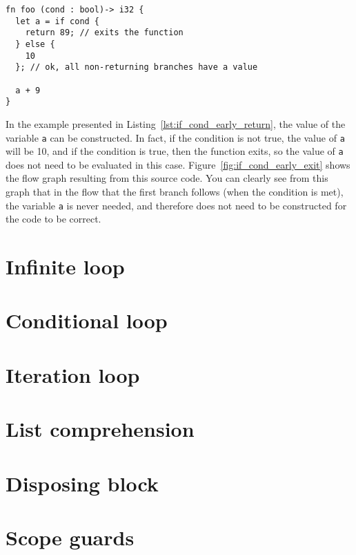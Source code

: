 \begin{lstlisting}[style=coloredverbatim, caption=Early return in \texttt{if} condition, label=lst:if_cond_early_return]
fn foo (cond : bool)-> i32 {
  let a = if cond {
    return 89; // exits the function
  } else {
    10
  }; // ok, all non-returning branches have a value

  a + 9
}
\end{lstlisting}

In the example presented in Listing~\ref{lst:if_cond_early_return}, the value of
the variable \texttt{a} can be constructed. In fact, if the condition is not
true, the value of \texttt{a} will be 10, and if the condition is true, then the
function exits, so the value of \texttt{a} does not need to be evaluated in this
case. Figure~\ref{fig:if_cond_early_exit} shows the flow graph resulting from
this source code. You can clearly see from this graph that in the flow that the
first branch follows (when the condition is met), the variable \texttt{a} is
never needed, and therefore does not need to be constructed for the code to be
correct.



\section{Infinite loop}%
\label{sec:inf_loop}

\section{Conditional loop}%
\label{sec:while_loop}

\section{Iteration loop}%
\label{sec:for_loop}

\section{List comprehension}%
\label{sec:list_compr}

\section{Disposing block}%
\label{sec:with_block}

\section{Scope guards}%
\label{sec:scope_guards}
